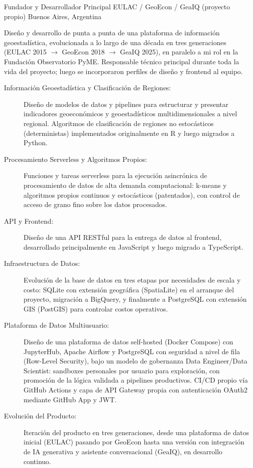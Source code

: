 	{Fundador y Desarrollador Principal}
	{EULAC / GeoEcon / GeaIQ (proyecto propio)}
	{Buenos Aires, Argentina}
	{}
	{Diseño y desarrollo de punta a punta de una plataforma de información geoestadística, evolucionada a lo largo de una década en tres generaciones (EULAC 2015 $\to$ GeoEcon 2018 $\to$ GeaIQ 2025), en paralelo a mi rol en la Fundación Observatorio PyME. Responsable técnico principal durante toda la vida del proyecto; luego se incorporaron perfiles de diseño y frontend al equipo.
	\begin{description}
	\item[Información Geoestadística y Clasificación de Regiones:] Diseño de modelos de datos y pipelines para estructurar y presentar indicadores geoeconómicos y geoestadísticos multidimensionales a nivel regional. Algoritmos de clasificación de regiones no estocásticos (deterministas) implementados originalmente en R y luego migrados a Python.
	\item[Procesamiento Serverless y Algoritmos Propios:] Funciones y tareas serverless para la ejecución asincrónica de procesamiento de datos de alta demanda computacional: k-means y algoritmos propios continuos y estocásticos (patentados), con control de acceso de grano fino sobre los datos procesados.
	\item[API y Frontend:] Diseño de una API RESTful para la entrega de datos al frontend, desarrollado principalmente en JavaScript y luego migrado a TypeScript.
	\item[Infraestructura de Datos:] Evolución de la base de datos en tres etapas por necesidades de escala y costo: SQLite con extensión geográfica (SpatiaLite) en el arranque del proyecto, migración a BigQuery, y finalmente a PostgreSQL con extensión GIS (PostGIS) para controlar costos operativos.
	\item[Plataforma de Datos Multiusuario:] Diseño de una plataforma de datos self-hosted (Docker Compose) con JupyterHub, Apache Airflow y PostgreSQL con seguridad a nivel de fila (Row-Level Security), bajo un modelo de gobernanza Data Engineer/Data Scientist: sandboxes personales por usuario para exploración, con promoción de la lógica validada a pipelines productivos. CI/CD propio vía GitHub Actions y capa de API Gateway propia con autenticación OAuth2 mediante GitHub App y JWT.
	\item[Evolución del Producto:] Iteración del producto en tres generaciones, desde una plataforma de datos inicial (EULAC) pasando por GeoEcon hasta una versión con integración de IA generativa y asistente conversacional (GeaIQ), en desarrollo continuo.
	\end{description}}

